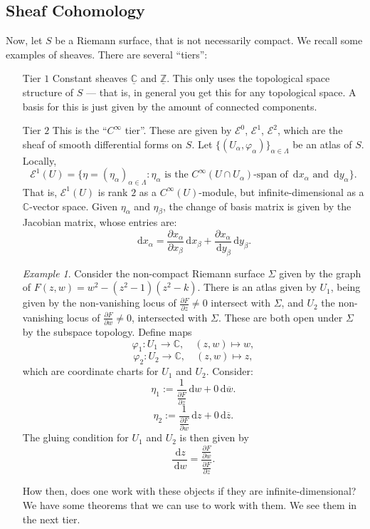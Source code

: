 \documentclass[a4paper]{report}
\theoremstyle{definition}
\theoremstyle{remark}
\theoremstyle{proposition}
\theoremstyle{conjecture}
\theoremstyle{lemma}
\theoremstyle{corollary}
\theoremstyle{exercise}
\theoremstyle{example}
\newtheorem{example}{Example}
\newcommand{\C}{\mathbb{C}}
\newcommand{\mcal}{\mathcal}
\newcommand{\diff}{\,\mathrm{d}}
\begin{document}
\subsection{Sheaf Cohomology}

Now, let $S$ be a Riemann surface, that is not necessarily compact. 
We recall some examples of sheaves. There are several ``tiers'':
\begin{enumerate}
    \item[Tier $1$] Constant sheaves $\underline{\C}$ and $\underline{\mathbb{Z}}$. 
        This only uses the topological space structure of $S$ --- that is,
        in general you get this for any topological space. A basis for 
        this is just given by the amount of connected components.
    \item[Tier $2$] This is the ``$C^\infty$ tier''. These are given by 
        $\mcal{E}^0$, $\mcal{E}^1$, $\mcal{E}^2$, which are the sheaf 
        of smooth differential forms on $S$. Let 
        $\lbrace (U_\alpha,\varphi_\alpha)\rbrace_{\alpha\in\Lambda}$ be an atlas of $S$.
        Locally, 
        $$\mcal{E}^1(U) = \lbrace \eta = (\eta_\alpha)_{\alpha\in\Lambda} : \text{$\eta_\alpha$ is the $C^\infty(U\cap U_\alpha)$-span of $\diff x_\alpha$ and 
        $\diff y_\alpha$}\rbrace.$$
        That is, $\mcal{E}^1(U)$ is rank $2$ as a $C^\infty(U)$-module, but infinite-dimensional
        as a $\C$-vector space.
        Given $\eta_\alpha$ and $\eta_\beta$, the change of basis matrix
        is given by the Jacobian matrix, whose entries are:
        $$\diff x_\alpha = \frac{\partial x_\alpha}{\partial x_\beta}\diff x_\beta + \frac{\partial x_\alpha}{\diff y_\beta} \diff y_\beta.$$
        \begin{example}
            Consider the non-compact Riemann surface $\Sigma$ given by the 
            graph of $F(z,w) = w^2- (z^2-1)(z^2-k)$. There is an atlas given by 
            $U_1$, being given by the non-vanishing locus of  
            $\frac{\partial F}{\partial z} \neq 0$ intersect with $\Sigma$, and 
            $U_2$ the non-vanishing locus of $\frac{\partial F}{\partial w}\neq 0$, intersected with $\Sigma$. These are both open under $\Sigma$ by the 
            subspace topology.
            Define maps $$\varphi_1  : U_1 \longrightarrow \C, \quad (z,w)\longmapsto w,$$
            $$\varphi_2 : U_2 \longrightarrow \C, \quad (z,w) \longmapsto z,$$
            which are coordinate charts for $U_1$ and $U_2$.
            Consider:
            $$\eta_1 := \frac{1}{\frac{\partial F}{\partial z}} \diff w + 0 \diff\overline{w}.$$
            $$\eta_2 := \frac{1}{\frac{\partial F}{\partial w}} \diff z + 0 \diff\overline{z}.$$ The gluing condition for $U_1$ and $U_2$ is then given by 
            $$\frac{\diff z}{\diff w} = \frac{\frac{\partial F}{\partial w}}{\frac{\partial F}{\partial z}}.$$
        \end{example}
        How then, does one work with these objects if they are 
        infinite-dimensional? We have some theorems that we can use to 
        work with them. We see them in the next tier.


\end{enumerate}
\end{document}
